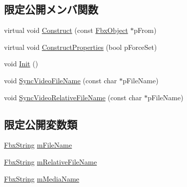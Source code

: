 \subsection*{限定公開メンバ関数}
\begin{DoxyCompactItemize}
\item 
virtual void \hyperlink{class_fbx_file_texture_a107d1612fc50f17722c77ee8df236eeb}{Construct} (const \hyperlink{class_fbx_object}{Fbx\+Object} $\ast$p\+From)
\item 
virtual void \hyperlink{class_fbx_file_texture_a698164ee49ac5fb2a5d5e3e7a2cb9e9f}{Construct\+Properties} (bool p\+Force\+Set)
\item 
void \hyperlink{class_fbx_file_texture_ad9c266407fb8319af33c1969144d6d1e}{Init} ()
\item 
void \hyperlink{class_fbx_file_texture_a8d4cbc0baefe64cd40d88892dd6dda69}{Sync\+Video\+File\+Name} (const char $\ast$p\+File\+Name)
\item 
void \hyperlink{class_fbx_file_texture_a4ae135194f3ebcc0982b3f730adbcb97}{Sync\+Video\+Relative\+File\+Name} (const char $\ast$p\+File\+Name)
\end{DoxyCompactItemize}
\subsection*{限定公開変数類}
\begin{DoxyCompactItemize}
\item 
\hyperlink{class_fbx_string}{Fbx\+String} \hyperlink{class_fbx_file_texture_a6bfc474030f0504725e7f474d26502d7}{m\+File\+Name}
\item 
\hyperlink{class_fbx_string}{Fbx\+String} \hyperlink{class_fbx_file_texture_ab42081ef2be0913cc666b9aca03c7373}{m\+Relative\+File\+Name}
\item 
\hyperlink{class_fbx_string}{Fbx\+String} \hyperlink{class_fbx_file_texture_a7160e65a71195ee17af051cc0d52514a}{m\+Media\+Name}
\end{DoxyCompactItemize}
